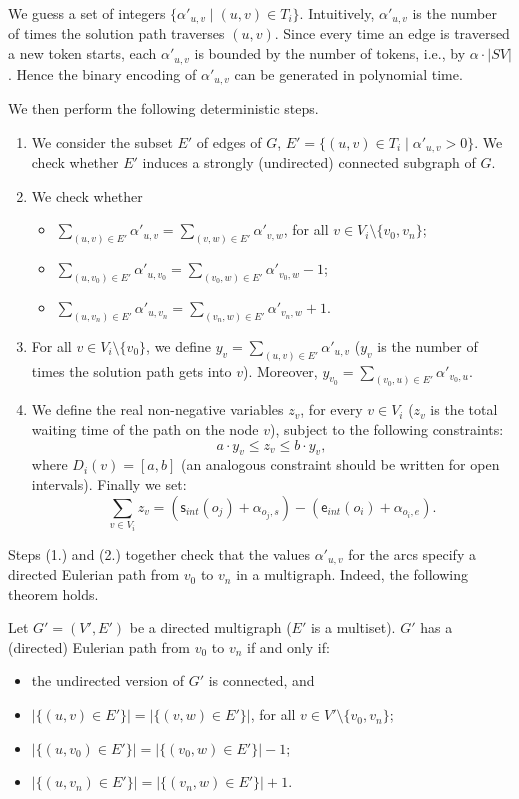 We guess 
a set of integers $\{\alpha'_{u,v}\mid (u,v)\in T_i\}$.
Intuitively, $\alpha'_{u,v}$ is the number of times the solution path
traverses $(u,v)$. Since every time an edge is traversed a new token starts, each $\alpha'_{u,v}$ is bounded by the number of tokens, i.e., by $\alpha \cdot |SV|$. Hence the binary encoding of $\alpha'_{u,v}$ can be generated in polynomial time.

We then perform the following deterministic steps.
\begin{enumerate}
\item We consider the subset $E'$ of edges of $G$, $E'=\{(u,v)\in T_i\mid \alpha'_{u,v}>0\}$. We check whether $E'$ induces a strongly (undirected) connected subgraph of $G$.
\item We check whether 
    \begin{itemize}
        \item $\sum_{(u,v)\in E'} \alpha'_{u,v}=\sum_{(v,w)\in E'} \alpha'_{v,w}$, for all $v \in V_i\setminus\{v_0,v_n\}$;
        \item $\sum_{(u,v_0)\in E'} \alpha'_{u,v_0}=\sum_{(v_0,w)\in E'} \alpha'_{v_0,w}-1$;
        \item $\sum_{(u,v_n)\in E'} \alpha'_{u,v_n}=\sum_{(v_n,w)\in E'} \alpha'_{v_n,w}+1$.
    \end{itemize}

\item For all $v \in V_i\setminus\{v_0\}$, we define $y_v=\sum_{(u,v)\in E'} \alpha'_{u,v}$ ($y_v$ is the number of times the solution path gets into $v$). Moreover, 
$y_{v_0} = \sum_{(v_0,u)\in E'} \alpha'_{v_0,u}$.
\item We define the real non-negative variables $z_v$, for every $v \in V_i$ ($z_v$ is the total waiting time of the path on the node $v$), subject to the following constraints:
\[a\cdot y_v \leq z_v \leq b\cdot y_v,\]
where $D_i(v)=[a,b]$ (an analogous constraint should be written for open intervals). Finally we set:
\[\sum_{v \in V_i} z_v = (\mathsf{s}_{int}(o_j)+\alpha_{o_j,s}) - (\mathsf{e}_{int}(o_i)+\alpha_{o_i,e}).\]
\end{enumerate}

Steps (1.) and (2.) together check that the values $\alpha'_{u,v}$ for the arcs specify
a directed Eulerian path from $v_0$ to $v_n$ in a multigraph. Indeed,
the following theorem holds.
\begin{theorem}\cite{Jung}
Let $G'=(V',E')$ be a directed multigraph ($E'$ is a multiset).
$G'$ has a (directed) Eulerian path from $v_0$ to $v_n$ if and only if:
\begin{itemize}
    \item the undirected version of $G'$ is connected, and
    \item $|\{(u,v)\in E'\}| =| \{(v,w)\in E'\}|$, for all $v \in V'\setminus\{v_0,v_n\}$;
    \item $|\{(u,v_0)\in E'\}|=|\{(v_0,w)\in E'\}|-1$;
    \item $|\{(u,v_n)\in E'\}|=|\{(v_n,w)\in E'\}|+1$.
\end{itemize}
\end{theorem}

